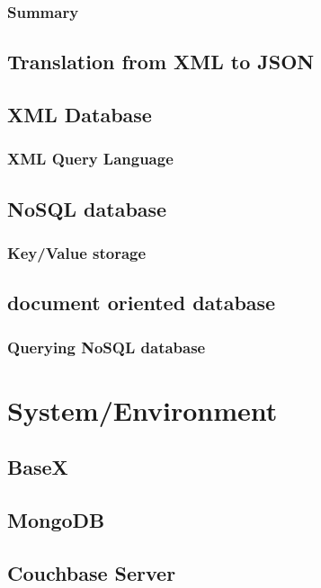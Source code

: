 \documentclass[a4paper,12pt]{article}
\begin{document}
			\subsubsection{Summary}
		\subsection{Translation from XML to JSON}
			
		\subsection{XML Database}
			\subsubsection{XML Query Language}
		\subsection{NoSQL database}
			\subsubsection{Key/Value storage}
			\subsection{document oriented database}
		\subsubsection{Querying NoSQL database}
	\newpage
	\section{System/Environment}
	\label{sec:three}
		\subsection{BaseX}
		\subsection{MongoDB}
		\label{couchbase-general}
		\subsection{Couchbase Server}
\end{document}
